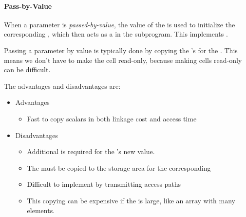 \paragraph{Pass-by-Value}\label{par:Parameter_Passing-Pass_By_Value}
\begin{definition}\label{def:Pass_By_Value}
  When a parameter is \emph{passed-by-value}, the value of the  is used to initialize the corresponding , which then acts as a  in the subprogram.
  This implements  .

  Passing a parameter by value is typically done by copying the 's  for the .
  This means we don't have to make the  cell read-only, because making cells read-only can be difficult.

  The advantages and disadvantages are:
  \begin{itemize}[noitemsep]
  \item Advantages
    \begin{itemize}[noitemsep]
    \item Fast to copy scalars in both linkage cost and access time
    \end{itemize}
  \item Disadvantages
    \begin{itemize}[noitemsep]
    \item Additional  is required for the 's new value.
    \item The  must be copied to the storage area for the corresponding 
    \item Difficult to implement by transmitting access paths
    \item This copying can be expensive if the  is large, like an array with many elements.
    \end{itemize}
  \end{itemize}
\end{definition}

